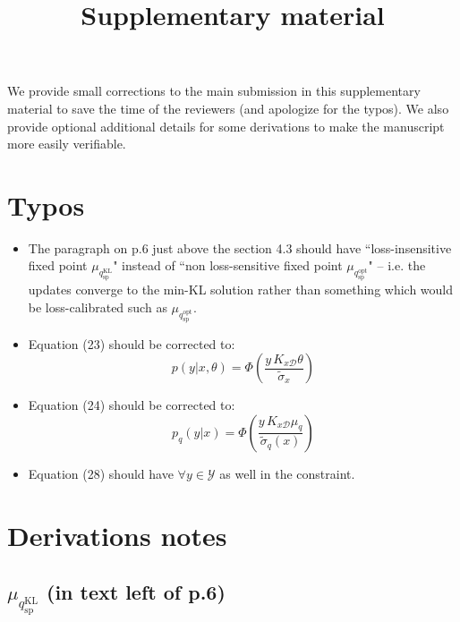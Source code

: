 \documentclass{article}
\newcommand{\dataset}{\mathcal{D}}
\begin{document}
\title{Supplementary material}%
\author{}%




\maketitle
We provide small corrections to the main submission in this supplementary material to save the time of the reviewers (and apologize for the typos). We also provide optional additional details for some derivations to make the manuscript more easily verifiable.

\section{Typos}
\begin{itemize}
  \item The paragraph on p.6 just above the section 4.3 should have ``loss-insensitive fixed point $\mu_{q_{\mathrm{sp}}^{\mathrm{KL}}}$" instead of ``non loss-sensitive fixed point $\mu_{q_{\mathrm{sp}}^{\mathrm{opt}}}$" -- i.e. the updates converge to the min-KL solution rather than something which would be loss-calibrated such as $\mu_{q_{\mathrm{sp}}^{\mathrm{opt}}}$.
  \item Equation (23) should be corrected to:
    $$
        p(y|x,\theta) = \Phi\left( \frac{y \,K_{x\dataset}\theta}{\tilde{\sigma}_x} \right)
    $$
  \item Equation (24) should be corrected to:
    $$
        p_q(y|x) = \Phi\left( \frac{y \,K_{x\dataset} \mu_q}{\tilde{\sigma}_q(x)} \right)
    $$
  \item Equation (28) should have $\forall y \in \mathcal{Y}$ as well in the constraint.
\end{itemize}

\section{Derivations notes}

\subsection{$\mu_{q_{\mathrm{sp}}^{\mathrm{KL}}}$ (in text left of p.6)}
\end{document}
